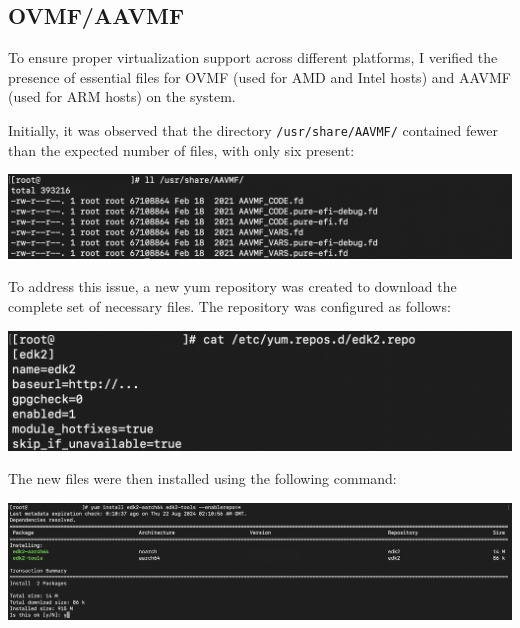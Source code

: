 \subsection{OVMF/AAVMF}

To ensure proper virtualization support across different platforms, I verified the presence of essential files for OVMF (used for AMD and Intel hosts) and AAVMF (used for ARM hosts) on the system.\mynewline

Initially, it was observed that the directory \texttt{/usr/share/AAVMF/} contained fewer than the expected number of files, with only six present:

\begin{center}
    \centering
    \includegraphics[width=\textwidth]{Images/AAVMF Incomplete Files.png}
    \label{fig:casa}
\end{center}

To address this issue, a new yum repository was created to download the complete set of necessary files. The repository was configured as follows:

\begin{center}
    \centering
    \includegraphics[width=\textwidth]{Images/Edk2 Yum Repository.png}
    \label{fig:casa}
\end{center}

The new files were then installed using the following command:

\begin{center}
    \centering
    \includegraphics[width=\textwidth]{Images/EDK2 Installation.png}
    \label{fig:casa}
\end{center}


